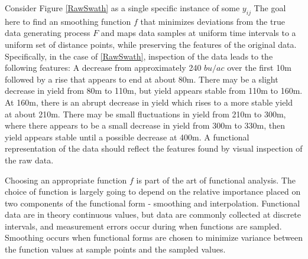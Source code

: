 \documentclass[phdcss]{SDSUThesis}
\begin{document}
Consider Figure \ref{RawSwath} as a single specific instance of some $y_{ij}$ The goal here to find an smoothing function $f$ that minimizes deviations from the true data generating process $F$ and maps data samples at uniform time intervals to a uniform set of distance points, while preserving the features of the original data. Specifically, in the case of \ref{RawSwath}, inspection of the data leads to the following features: A decrease from approximately 240 $bu/ac$ over the first 10m followed by a rise that appears to end at about 80m. There may be a slight decrease in yield from 80m to 110m, but yield appears stable from 110m to 160m. At 160m, there is an abrupt decrease in yield which rises to a more stable yield at about 210m. There may be small fluctuations in yield from 210m to 300m, where there appears to be a small decrease in yield from 300m to 330m, then yield appears stable until a possible decrease at 400m. A functional representation of the data should reflect the features found by visual inspection of the raw data.

Choosing an appropriate function $f$ is part of the art of functional analysis. The choice of function is largely going to depend on the relative importance placed on two components of the functional form - smoothing and interpolation. Functional data are in theory continuous values, but data are commonly collected at discrete intervals, and measurement errors occur during when functions are sampled. Smoothing occurs when functional forms are chosen to minimize variance between the function values at sample points and the sampled values.




\end{document}
